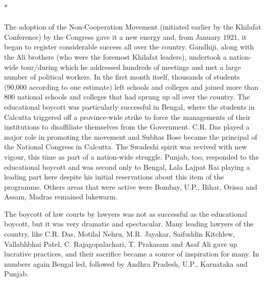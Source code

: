 \begin{multicols}{2}
\begin{center}*\end{center}

\paragraph*{}

The adoption of the Non-Cooperation Movement (initiated earlier by the Khilafat Conference) by the Congress gave it a new energy and, from January 1921, it began to register considerable success all over the country. Gandhiji, along with the Ali brothers (who were the foremost Khilafat leaders), undertook a nation-wide tour/during which he addressed hundreds of meetings and met a large number of political workers. In the first month itself, thousands of students (90,000 according to one estimate) left schools and colleges and joined more than 800 national schools and colleges that had sprung up all over the country. The educational boycott was particularly successful in Bengal, where the students in Calcutta triggered off a province-wide strike to force the managements of their institutions to disaffiliate themselves from the Government. C.R. Das played a major role in promoting the movement and Subhas Bose became the principal of the National Congress in Calcutta. The Swadeshi spirit was revived with new vigour, this time as part of a nation-wide struggle. Punjab, too, responded to the educational boycott and was second only to Bengal, Lala Lajpat Rai playing a leading part here despite his initial reservations about this item of the programme. Others areas that were active were Bombay, U.P., Bihar, Orissa and Assam, Madras remained lukewarm. 

The boycott of law courts by lawyers was not as successful as the educational boycott, but it was very dramatic and spectacular. Many leading lawyers of the country, like C.R. Das, Motilal Nehru, M.R. Jayakar, Saifuddin Kitchlew, Vallabhbhai Patel, C. Rajagopalachari, T. Prakasam and Asaf Ali gave up lucrative practices, and their sacrifice became a source of inspiration for many. In numbers again Bengal led, followed by Andhra Pradesh, U.P., Karnataka and Punjab. 


\end{multicols}
